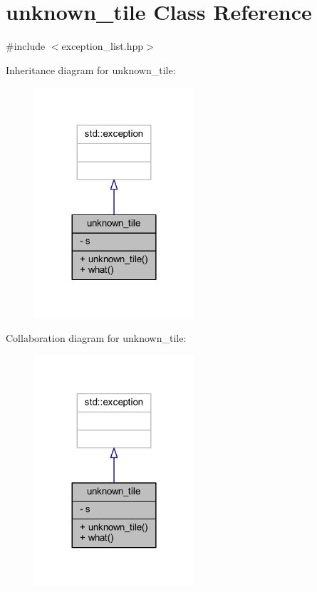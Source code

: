 \hypertarget{classunknown__tile}{}\section{unknown\+\_\+tile Class Reference}
\label{classunknown__tile}


{\ttfamily \#include $<$exception\+\_\+list.\+hpp$>$}



Inheritance diagram for unknown\+\_\+tile\+:
\nopagebreak
\begin{figure}[H]
\begin{center}
\leavevmode
\includegraphics[width=168pt]{classunknown__tile__inherit__graph}
\end{center}
\end{figure}


Collaboration diagram for unknown\+\_\+tile\+:
\nopagebreak
\begin{figure}[H]
\begin{center}
\leavevmode
\includegraphics[width=168pt]{classunknown__tile__coll__graph}
\end{center}
\end{figure}
